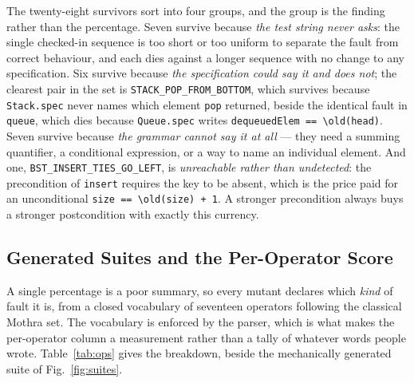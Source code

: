 \documentclass[conference]{IEEEtran}
\begin{document}
The twenty-eight survivors sort into four groups, and the group is the finding rather
than the percentage. Seven survive because \emph{the test string never asks}: the
single checked-in sequence is too short or too uniform to separate the fault from
correct behaviour, and each dies against a longer sequence with no change to any
specification. Six survive because \emph{the specification could say it and does not};
the clearest pair in the set is \texttt{STACK\_POP\_FROM\_BOTTOM}, which survives
because \texttt{Stack.spec} never names which element \texttt{pop} returned, beside the
identical fault in \texttt{queue}, which dies because \texttt{Queue.spec} writes
\texttt{dequeuedElem == \textbackslash old(head)}. Seven survive because \emph{the
grammar cannot say it at all} --- they need a summing quantifier, a conditional
expression, or a way to name an individual element. And one,
\texttt{BST\_INSERT\_TIES\_GO\_LEFT}, is \emph{unreachable rather than undetected}: the
precondition of \texttt{insert} requires the key to be absent, which is the price paid
for an unconditional \texttt{size == \textbackslash old(size) + 1}. A stronger
precondition always buys a stronger postcondition with exactly this currency.

\subsection{Generated Suites and the Per-Operator Score}

A single percentage is a poor summary, so every mutant declares which \emph{kind} of
fault it is, from a closed vocabulary of seventeen operators following the classical
Mothra set. The vocabulary is enforced by the parser, which is what makes the
per-operator column a measurement rather than a tally of whatever words people wrote.
Table~\ref{tab:ops} gives the breakdown, beside the mechanically generated suite of
Fig.~\ref{fig:suites}.
\end{document}
